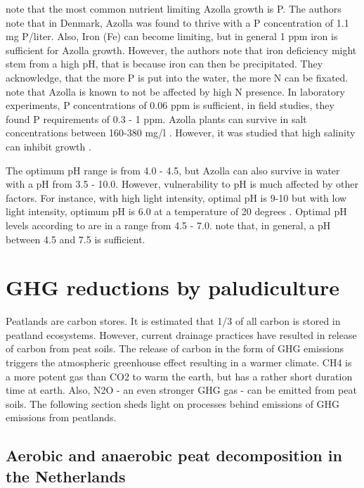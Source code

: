 {\citet{lumpkin1980azolla} note that the most common nutrient limiting Azolla growth is P. The authors note that in Denmark, Azolla was found to thrive with a P concentration of 1.1 mg P/liter. Also, Iron (Fe) can become limiting, but in general 1 ppm iron is  sufficient for Azolla growth. However, the authors note that iron deficiency might stem from a high pH, that is because iron can then be precipitated. They acknowledge, that the more P is put into the water, the more N can be fixated. \citet{sabetraftar2013review} note that Azolla is known to not be affected by high N presence. In laboratory experiments, P concentrations of 0.06 ppm is sufficient, in field studies, they found P requirements of 0.3 - 1 ppm. Azolla plants can survive in salt concentrations between 160-380 mg/l  \citep{lumpkin1980azolla}. However, it was studied that high salinity can inhibit growth \citep{sabetraftar2013review, lumpkin1980azolla}. 

The optimum pH range is from 4.0 - 4.5, but Azolla can also survive in water with a pH from 3.5 - 10.0. However, vulnerability to pH is much affected by other factors. For instance, with high light intensity, optimal pH is 9-10 but with low light intensity, optimum pH is 6.0 at a temperature of 20 degrees \citep{wagner1997azolla}. Optimal pH levels according to \citet{lumpkin1980azolla} are in a range from 4.5 - 7.0. \citet{sabetraftar2013review} note that, in general, a pH between 4.5 and 7.5 is sufficient.


\chapter{GHG reductions by paludiculture}

Peatlands are carbon stores. It is estimated that 1/3 of all carbon is stored in peatland ecosystems. However, current drainage practices have resulted in release of carbon from peat soils. The release of carbon in the form of GHG emissions triggers the atmospheric greenhouse effect resulting in a warmer climate. CH4 is a more potent gas than CO2 to warm the earth, but has a rather short duration time at earth. Also, N2O - an even stronger GHG gas - can be emitted from peat soils. The following section sheds light on processes behind emissions of GHG emissions from peatlands.

\section{Aerobic and anaerobic peat decomposition in the Netherlands}

}
